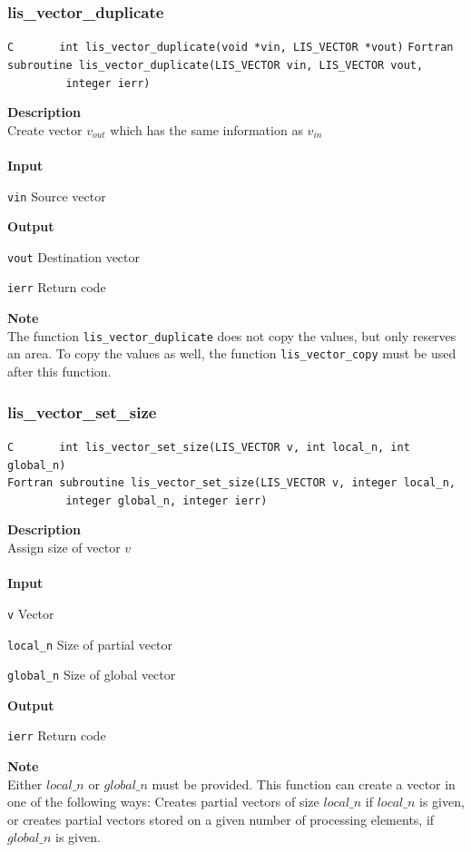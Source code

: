 \documentclass[a4paper]{article}
\newcommand{\namelistlabel}[1]{\mbox{#1}\hfill}
\newenvironment{namelist}[1]{%
 \begin{list}{}
  {\let\makelabel\namelistlabel
  \settowidth{\labelwidth}{#1}
  \setlength{\leftmargin}{1.1\labelwidth}}
}{%
\end{list}}
\begin{document}
  \subsubsection{lis\_vector\_duplicate}
\begin{screen}
\verb|C       int lis_vector_duplicate(void *vin, LIS_VECTOR *vout)|
\verb|Fortran subroutine lis_vector_duplicate(LIS_VECTOR vin, LIS_VECTOR vout,|\\
\verb|         integer ierr)|
\end{screen}
{\bf Description}\\
\indent
Create vector $v_{out}$ which has the same information as $v_{in}$
\\ \\
\noindent
{\bf Input}
\begin{namelist}{XXXXXXXXXXXXXXXXXXXX}
\item[\tt vin] Source vector
\end{namelist}
{\bf Output}
\begin{namelist}{XXXXXXXXXXXXXXXXXXXX}
\item[\tt vout] Destination vector
\item[\tt ierr] Return code
\end{namelist}
{\bf Note}\\
\indent
The function \verb|lis_vector_duplicate| does not copy the values, 
but only reserves an area. To copy the values as well, 
the function \verb|lis_vector_copy| must be used after this function.
\newpage
\subsubsection{lis\_vector\_set\_size}
\begin{screen}
\verb|C       int lis_vector_set_size(LIS_VECTOR v, int local_n, int global_n)|\\
\verb|Fortran subroutine lis_vector_set_size(LIS_VECTOR v, integer local_n,|\\
\verb|         integer global_n, integer ierr)| 
\end{screen}
{\bf Description}\\
\indent
Assign size of vector $v$ 
\\ \\
\noindent
{\bf Input}
\begin{namelist}{XXXXXXXXXXXXXXXXXXXX}
\item[\tt v] Vector
\item[\tt local\_n] Size of partial vector
\item[\tt global\_n] Size of global vector
\end{namelist}
{\bf Output}
\begin{namelist}{XXXXXXXXXXXXXXXXXXXX}
\item[\tt ierr] Return code
\end{namelist}
{\bf Note}\\
\indent
Either $local\_n$ or $global\_n$ must be provided. 
This function can create a vector in one of the following ways: 
Creates partial vectors of size $local\_n$ if $local\_n$ is 
given, or creates partial vectors stored on a given number of
processing elements, if $global\_n$ is given.
\end{document}
